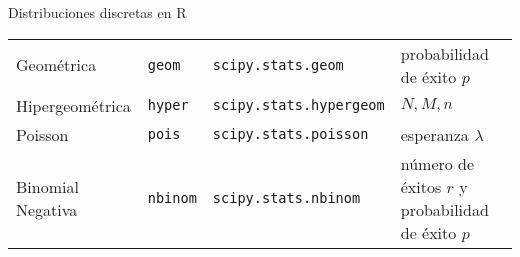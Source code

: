 \documentclass[
  ignorenonframetext,
]{beamer}
\begin{document}
\begin{frame}[fragile]{Distribuciones discretas en R}
\begin{longtable}[]{@{}llll@{}}
\begin{minipage}[t]{0.22\columnwidth}
Geométrica\strut
\end{minipage} & \begin{minipage}[t]{0.22\columnwidth}\raggedright
\texttt{geom}\strut
\end{minipage} & \begin{minipage}[t]{0.22\columnwidth}\raggedright
\texttt{scipy.stats.geom}\strut
\end{minipage} & \begin{minipage}[t]{0.22\columnwidth}\raggedright
probabilidad de éxito \(p\)\strut
\end{minipage}\tabularnewline
\begin{minipage}[t]{0.22\columnwidth}\raggedright
Hipergeométrica\strut
\end{minipage} & \begin{minipage}[t]{0.22\columnwidth}\raggedright
\texttt{hyper}\strut
\end{minipage} & \begin{minipage}[t]{0.22\columnwidth}\raggedright
\texttt{scipy.stats.hypergeom}\strut
\end{minipage} & \begin{minipage}[t]{0.22\columnwidth}\raggedright
\(N,M,n\)\strut
\end{minipage}\tabularnewline
\begin{minipage}[t]{0.22\columnwidth}\raggedright
Poisson\strut
\end{minipage} & \begin{minipage}[t]{0.22\columnwidth}\raggedright
\texttt{pois}\strut
\end{minipage} & \begin{minipage}[t]{0.22\columnwidth}\raggedright
\texttt{scipy.stats.poisson}\strut
\end{minipage} & \begin{minipage}[t]{0.22\columnwidth}\raggedright
esperanza \(\lambda\)\strut
\end{minipage}\tabularnewline
\begin{minipage}[t]{0.22\columnwidth}\raggedright
Binomial Negativa\strut
\end{minipage} & \begin{minipage}[t]{0.22\columnwidth}\raggedright
\texttt{nbinom}\strut
\end{minipage} & \begin{minipage}[t]{0.22\columnwidth}\raggedright
\texttt{scipy.stats.nbinom}\strut
\end{minipage} & \begin{minipage}[t]{0.22\columnwidth}\raggedright
número de éxitos \(r\) y probabilidad de éxito \(p\)\strut
\end{minipage}\tabularnewline
\bottomrule
\end{longtable}

\end{frame}
\end{document}
